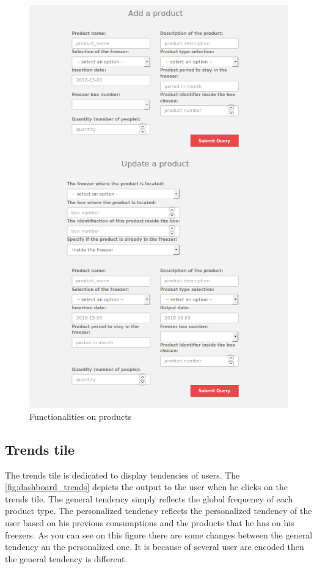 \begin{figure}[H]
\centering
\includegraphics[scale=0.5]{./images/dashboard_products2.png}
\caption{Functionalities on products}
\label{fig:dashboard_products2}
\end{figure}

\subsection{Trends tile}
The trends tile is dedicated to display tendencies of users. The \autoref{fig:dashboard_trends} depicts the output to the user when he clicks on the trends tile. The general tendency simply reflects the global frequency of each product type. The personalized tendency reflects the personalized tendency of the user based on his previous consumptions and the products that he has on his freezers. As you can see on this figure there are some changes between the general tendency an the personalized one. It is because of several user are encoded then the general tendency is different.

